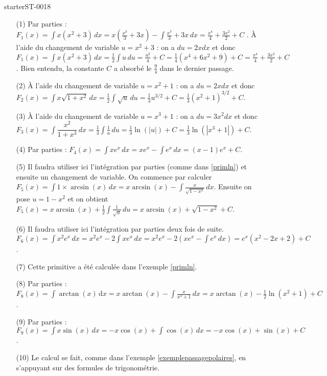 
\begin{corrige}{starterST-0018}

  \begin{enumerate}
  \item[(1)] Par parties : $F_{1}(x)=\displaystyle\int x(x^2+3) \,dx = x\left(\frac{x^3}{3} + 3x\right) - \int \frac{x^3}{3} + 3x \, dx = \frac{x^4}{4} + \frac{3x^2}{2} + C $ . 
    À l'aide du changement de variable $ u = x^2+3$ : on a $du = 2x  dx$ et donc $F_{1}(x)=\displaystyle\int x(x^2+3) \,dx =\frac{1}{2} \int u \, du = \frac{u^2}{4} + C = \frac{1}{4}\left(x^4 + 6 x^2 + 9 \right) + C = \frac{x^4}{4} + \frac{3x^2}{2} + C $. Bien entendu, la constante $C$ a absorbé le $\frac{9}{4}$ dans le dernier passage.   
  \item[(2)] À l'aide du changement de variable $ u = x^2+1$ : on a $du = 2x  dx$ et donc $F_{2}(x)=\displaystyle\int x\sqrt{1+x^2} \,dx = \frac{1}{2} \int \sqrt{u} \, du  = \frac{1}{3} u^{3/2} + C = \frac{1}{3} (x^2+1)^{3/2} + C  $.
  \item[(3)] À l'aide du changement de variable $ u = x^3+1$ : on a $du = 3x^2  dx$ et donc $F_{3}(x)=\displaystyle\int \dfrac{x^2}{1+x^3} \,dx = \frac{1}{3} \int \frac{1}{u} \, du = \frac{1}{3}\ln(|u|) +C  = \frac{1}{3}\ln(|x^3 + 1|) +C  $. 
  \item[(4)] Par parties : $F_{4}(x)=\displaystyle\int x e^x  \,dx = x e^x - \int e^x  \,dx = (x-1) e^x + C$. 
  \item[(5)] Il faudra utiliser ici l'intégration par parties (comme dans \ref{primln}) et ensuite un changement de variable. On commence par calculer $F_{5}(x)=\displaystyle\int 1 \times \arcsin (x) \,dx  =  x\arcsin(x) - \int \frac{x}{\sqrt{1-x^2}} \, dx $. Ensuite on pose $u = 1-x^2$ et on obtient $F_{5}(x)=\displaystyle x\arcsin(x) +\frac{1}{2} \int \frac{1}{\sqrt{u}} \, du  = x\arcsin(x) +\sqrt{1-x^2} + C$. 
  \item[(6)]  Il faudra utiliser ici l'intégration par parties deux fois de suite. $F_{6}(x)=\displaystyle\int x^2 e^x  \,dx = x^2 e^x -2\int x e^x  \,dx = x^2 e^x -2\left(x e^x - \int e^x  \,dx\right) = e^x\left(x^2-2x +2\right) +C$.  
  \item[(7)] Cette primitive a été calculée dans l'exemple \ref{primln}. 
    \item[(8)]  Par parties : $F_{8}(x)=\displaystyle\int\arctan (x) \,\mathrm dx = x\arctan (x)-\int \frac{x}{x^2+1}\,dx = x\arctan (x)-\frac{1}{2}\ln(x^2+1) + C$. 
  \item[(9)]  Par parties : $F_{9}(x)=\displaystyle\int x\sin (x) \, dx = -x\cos(x) + \int\cos(x)\, dx = -x\cos(x) +\sin(x) + C$. 
  \item[(10)] Le calcul se fait, comme dans l'exemple \ref{exemplepassagepolaires}, en s'appuyant sur des formules de trigonométrie. 


\end{enumerate}
\end{corrige}
